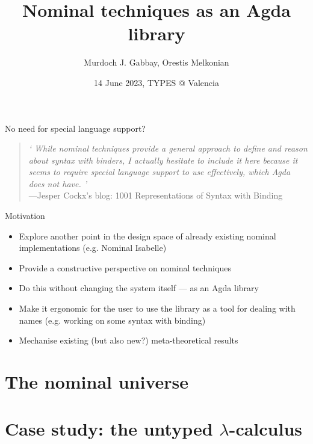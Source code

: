 \documentclass[aspectratio=169]{beamer}
\title{Nominal techniques as an Agda library}
\author{Murdoch J. Gabbay, \alert{Orestis Melkonian}}
\date{14 June 2023, TYPES @ Valencia}
\newcommand\myblockquote[2]{%
  \blockquote{\hspace*{2em}\emph{`#1'}#2}\par}
\renewcommand\alert[1]{\textcolor{mLightBrown}{#1}}
\begin{document}
\AgdaNoSpaceAroundCode{}



\begin{center}
\maketitle
\end{center}

\begin{frame}{\alert{No need} for special language support?}
\myblockquote{\textit{
While nominal techniques provide a general approach to define and reason about syntax with binders, I actually hesitate to include it here because it seems to require special language support to use effectively, which Agda does not have.
}}{\\---Jesper Cockx's blog: 1001 Representations of Syntax with Binding}
\end{frame}

\begin{frame}{Motivation}
\begin{itemize}
\item Explore another \alert{point in the design space} of already existing nominal implementations (e.g. Nominal Isabelle)
\item Provide a \alert{constructive} perspective on nominal techniques
\item Do this \alert{without changing the system itself} --- as an Agda library
\item Make it \alert{ergonomic} for the user to use the library as a tool for dealing with names
(e.g. working on some syntax with binding)
\item Mechanise existing (but also new?) \alert{meta-theoretical results}
\end{itemize}
\end{frame}

\section{The nominal universe}






\section{Case study: the untyped $\lambda$-calculus}




\end{document}
